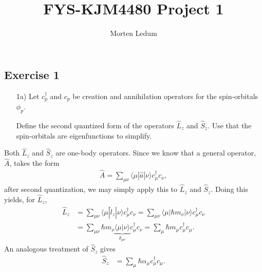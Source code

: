 \documentclass[a4paper]{article}
\title{FYS-KJM4480 Project 1}
\date{}
\author{Morten Ledum}
\newcommand{\nn}{\nonumber}
\begin{document}
\maketitle
\subsection*{Exercise 1}
\begin{exframe}
\begin{itemize}
  \item[1a)] Let $c_p^\dagger$ and $c_p$ be creation and annihilation operators for the spin-orbitals $\phi_p$. 

  Define the second quantized form of the operators $\hat{L}_z$ and $\hat{S}_z$. Use that the spin-orbitals are eigenfunctions to simplify.
\end{itemize}
\end{exframe}
Both $\hat{L}_z$ and $\hat{S}_z$ are one-body operators. Since we know that a general operator, $\hat{A}$, takes the form 
\begin{align}
\hat{A}=\sum_{\mu \nu} \langle \mu | \hat a | \nu \rangle c^\dagger_\mu c_\nu,
\end{align}
after second quantization, we may simply apply this to $\hat{L}_z$ and $\hat{S}_z$. Doing this yields, for $\hat{L}_z$, 
\begin{align}
\hat{L}_z &= \sum_{\mu \nu} \langle \mu | \hat{l}_z | \nu \rangle c^\dagger_\mu c_\nu =  \sum_{\mu \nu} \langle \mu | \hbar m_\nu | \nu \rangle c^\dagger_\mu c_\nu \nn\\
&= \sum_{\mu \nu} \hbar m_\nu \underbrace{\langle \mu |  \nu \rangle}_{\delta_{\mu \nu}} c^\dagger_\mu c_\nu = \sum_{\mu} \hbar m_\mu c^\dagger_\mu c_\mu.
\end{align}
An analogous treatment of $\hat{S}_z$ gives 
\begin{align}
\hat{S}_z &= \sum_{\mu} \hbar \alpha_\mu c^\dagger_\mu c_\mu. 
\end{align}
\end{document}
